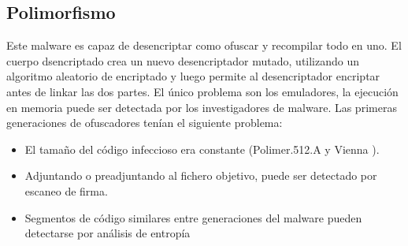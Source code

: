 \documentclass[15pt]{article}
\begin{document}
	\subsection{Polimorfismo}
	Este malware es capaz de desencriptar como ofuscar y recompilar todo en uno. El cuerpo dsencriptado crea un nuevo desencriptador mutado, utilizando un algoritmo aleatorio de encriptado y luego permite al desencriptador encriptar antes de linkar las dos partes. El único problema son los emuladores, la ejecución en memoria puede ser detectada por los investigadores de malware.
	Las primeras generaciones de ofuscadores tenían el siguiente problema:
	\begin{itemize}
		\item El tamaño del código infeccioso era constante (Polimer.512.A y Vienna \cite{vienna}).
		\item Adjuntando o preadjuntando al fichero objetivo, puede ser detectado por escaneo de firma.
		\item Segmentos de código similares entre generaciones del malware pueden detectarse por análisis de entropía
	\end{itemize}
\end{document}
